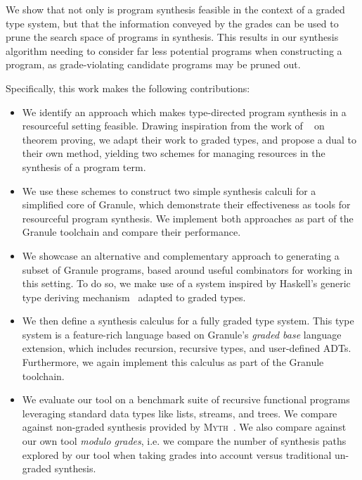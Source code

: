 We show that not only is program synthesis feasible in the context
of a graded type system, but that the information conveyed by the grades can be
used to prune the search space of programs in synthesis. This results in our
synthesis algorithm needing to consider far less potential programs when
constructing a program, as grade-violating candidate programs may be pruned out. 

Specifically, this work makes the following contributions:
\begin{itemize}
  \item We identify an approach which makes type-directed program synthesis in
        a resourceful setting feasible. Drawing inspiration from the work of
        ~\citet{HODAS1994327} on theorem proving, we adapt their
        work to graded types, and propose a dual to their own method, yielding two
        schemes for managing resources in the
        synthesis of a program term. 

  \item We use these schemes to construct two simple synthesis calculi for a
        simplified core of Granule, which demonstrate their effectiveness as
        tools for resourceful program synthesis. We implement both approaches as 
        part of the Granule toolchain and compare their performance.

  \item We showcase an alternative and complementary approach to generating a
        subset of Granule programs, based around useful combinators for working
        in this setting. To do so, we make use of a system inspired by Haskell's
        generic type deriving mechanism~\citep{generic-deriving} adapted to
        graded types.

  \item We then define a synthesis calculus for a fully graded type system. This
        type system is a feature-rich language based on Granule's \emph{graded
        base} language extension, which includes recursion, recursive types, and
        user-defined ADTs. Furthermore, we again implement this calculus as part
        of the Granule toolchain.

  \item We evaluate our tool on a benchmark suite of recursive functional
        programs leveraging standard data types like lists, streams, and trees.
        We compare against non-graded synthesis provided by
        \textsc{Myth}~\citep{oseraMYTH1}. We also compare against our own tool
        \emph{modulo grades}, i.e. we compare the number of synthesis paths
        explored by our tool when taking grades into account versus traditional
        un-graded synthesis.


\end{itemize}
